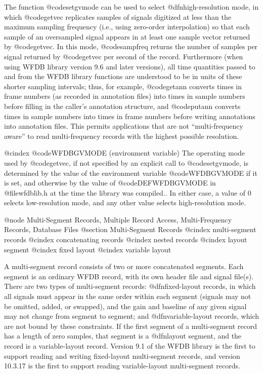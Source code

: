 {{{{{{{{{{The function @code{setgvmode} can be used to select @dfn{high-resolution} mode,
in which @code{getvec} replicates samples of signals digitized at less than the
maximum sampling frequency (i.e., using zero-order interpolation) so that each
sample of an oversampled signal appears in at least one sample vector returned
by @code{getvec}.  In this mode, @code{sampfreq} returns the number of samples
per signal returned by @code{getvec} per second of the record.  Furthermore
(when using WFDB library version 9.6 and later versions), all time quantities
passed to and from the WFDB library functions are understood to be in units of
these shorter sampling intervals; thus, for example, @code{getann} converts
times in frame numbers (as recorded in annotation files) into times in sample
numbers before filling in the caller's annotation structure, and @code{putann}
converts times in sample numbers into times in frame numbers before writing
annotations into annotation files.  This permits applications that are not
``multi-frequency aware'' to read multi-frequency records with the highest
possible resolution.

@cindex @code{WFDBGVMODE} (environment variable)
The operating mode used by @code{getvec}, if not specified by an explicit call
to @code{setgvmode}, is determined by the value of the environment variable
@code{WFDBGVMODE} if it is set, and otherwise by the value of
@code{DEFWFDBGVMODE} in @file{wfdblib.h} at the time the library was compiled..
In either case, a value of 0 selects low-resolution mode, and any other value
selects high-resolution mode.

@node     Multi-Segment Records, Multiple Record Access, Multi-Frequency Records, Database Files
@section Multi-Segment Records
@cindex multi-segment records
@cindex concatenating records
@cindex nested records
@cindex layout segment
@cindex fixed layout
@cindex variable layout

A multi-segment record consists of two or more concatenated segments.
Each segment is an ordinary WFDB record, with its own header file and
signal file(s).  There are two types of multi-segment records:
@dfn{fixed-layout} records, in which all signals must appear in the
same order within each segment (signals may not be omitted, added, or
swapped), and the gain and baseline of any given signal may not change
from segment to segment; and @dfn{variable-layout} records, which are
not bound by these constraints.  If the first segment of a
multi-segment record has a length of zero samples, that segment is a
@dfn{layout segment}, and the record is a variable-layout record.
Version 9.1 of the WFDB library is the first to support reading and
writing fixed-layout multi-segment records, and version 10.3.17 is the
first to support reading variable-layout multi-segment records.

}}}}}}}}}}
